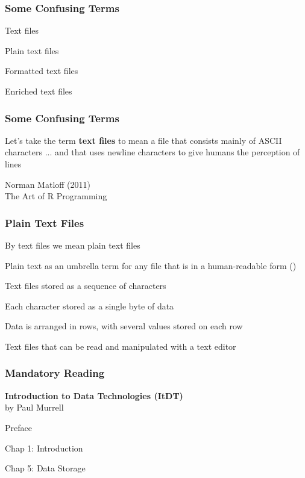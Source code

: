 \documentclass[12pt]{beamer}\usepackage[]{graphicx}\usepackage[]{color}
\begin{document}

\begin{frame}
\frametitle{Some Confusing Terms}

\bbi
  \item Text files
  \item Plain text files
  \item Formatted text files
  \item Enriched text files
\ei

\end{frame}


\begin{frame}
\frametitle{Some Confusing Terms}

Let's take the term \textbf{text files} to mean a file that consists mainly of ASCII characters ... and that uses newline characters to give humans the perception of lines

\bigskip
{\footnotesize
Norman Matloff (2011) \\
{\mdlit The Art of R Programming}
}

\end{frame}


\begin{frame}
\frametitle{Plain Text Files}

\bi
  \item By text files we mean plain text files
  \item Plain text as an umbrella term for any file that is in a human-readable form ()
  \item Text files stored as a sequence of characters
  \item Each character stored as a single byte of data
  \item Data is arranged in rows, with several values stored on each row
  \item Text files that can be read and manipulated with a text editor
\ei

\end{frame}


\begin{frame}
\frametitle{Mandatory Reading}

{\large \textbf{Introduction to Data Technologies (ItDT)} \\
by Paul Murrell

\bigskip
{\mdlit 
\bi
  \item Preface
  \item Chap 1: Introduction
  \item Chap 5: Data Storage
\ei}
}

\end{frame}
\end{document}
